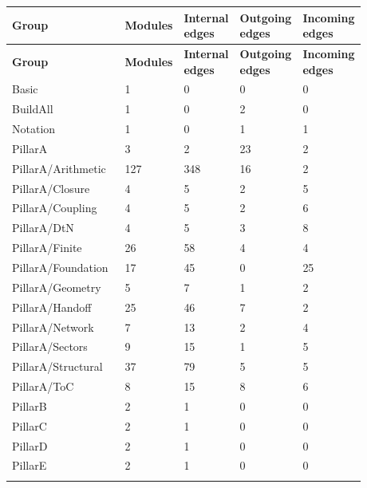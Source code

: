 \small
{}
\begin{longtable}{L{0.36\linewidth} L{0.1\linewidth} L{0.14\linewidth} L{0.14\linewidth} L{0.14\linewidth}}
\hline
\textbf{Group} & \textbf{Modules} & \textbf{Internal edges} & \textbf{Outgoing edges} & \textbf{Incoming edges}\\
\hline
\endfirsthead
\hline
\textbf{Group} & \textbf{Modules} & \textbf{Internal edges} & \textbf{Outgoing edges} & \textbf{Incoming edges}\\
\hline
\endhead
Basic & 1 & 0 & 0 & 0\\
\hline
\addlinespace[0.24em]
BuildAll & 1 & 0 & 2 & 0\\
\hline
\addlinespace[0.24em]
Notation & 1 & 0 & 1 & 1\\
\hline
\addlinespace[0.24em]
PillarA & 3 & 2 & 23 & 2\\
\hline
\addlinespace[0.24em]
PillarA/\allowbreak{}Arithmetic & 127 & 348 & 16 & 2\\
\hline
\addlinespace[0.24em]
PillarA/\allowbreak{}Closure & 4 & 5 & 2 & 5\\
\hline
\addlinespace[0.24em]
PillarA/\allowbreak{}Coupling & 4 & 5 & 2 & 6\\
\hline
\addlinespace[0.24em]
PillarA/\allowbreak{}DtN & 4 & 5 & 3 & 8\\
\hline
\addlinespace[0.24em]
PillarA/\allowbreak{}Finite & 26 & 58 & 4 & 4\\
\hline
\addlinespace[0.24em]
PillarA/\allowbreak{}Foundation & 17 & 45 & 0 & 25\\
\hline
\addlinespace[0.24em]
PillarA/\allowbreak{}Geometry & 5 & 7 & 1 & 2\\
\hline
\addlinespace[0.24em]
PillarA/\allowbreak{}Handoff & 25 & 46 & 7 & 2\\
\hline
\addlinespace[0.24em]
PillarA/\allowbreak{}Network & 7 & 13 & 2 & 4\\
\hline
\addlinespace[0.24em]
PillarA/\allowbreak{}Sectors & 9 & 15 & 1 & 5\\
\hline
\addlinespace[0.24em]
PillarA/\allowbreak{}Structural & 37 & 79 & 5 & 5\\
\hline
\addlinespace[0.24em]
PillarA/\allowbreak{}ToC & 8 & 15 & 8 & 6\\
\hline
\addlinespace[0.24em]
PillarB & 2 & 1 & 0 & 0\\
\hline
\addlinespace[0.24em]
PillarC & 2 & 1 & 0 & 0\\
\hline
\addlinespace[0.24em]
PillarD & 2 & 1 & 0 & 0\\
\hline
\addlinespace[0.24em]
PillarE & 2 & 1 & 0 & 0\\
\hline
\addlinespace[0.24em]
\end{longtable}
\normalsize

